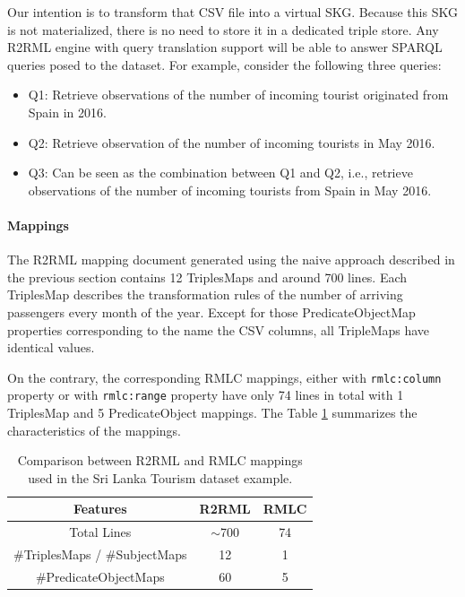 Our intention is to transform that CSV file into a virtual SKG. Because this SKG is not materialized, there is no need to store it in a dedicated triple store. Any R2RML engine with query translation support will be able to answer SPARQL queries posed to the dataset. For example, consider the following three queries:
\begin{itemize}
\item Q1: Retrieve observations of the number of incoming tourist originated from Spain in 2016.
\item Q2: Retrieve observation of the number of incoming tourists in May 2016.
\item Q3: Can be seen as the combination between Q1 and Q2, i.e., retrieve observations of the number of incoming tourists from Spain in May 2016. 
\end{itemize}

\noindent\paragraph{Mappings}
The R2RML mapping document generated using the naive approach described in the previous section contains 12 TriplesMaps and around 700 lines. Each TriplesMap describes the transformation rules of the number of arriving passengers every month of the year. Except for those PredicateObjectMap properties corresponding to the name the CSV columns, all TripleMaps have identical values. 

On the contrary, the corresponding RMLC mappings, either with \texttt{rmlc:column} property or with \texttt{rmlc:range} property have only 74 lines in total with 1 TriplesMap and 5 PredicateObject mappings. The Table \ref{table:compare1} summarizes the characteristics of the mappings.

\begin{table}[tbp]
\caption{Comparison between R2RML and RMLC mappings used in the Sri Lanka Tourism dataset example.}
\label{table:compare1}
\begin{tabular}{c|c|c}
\hline
\textbf{Features} & \textbf{R2RML}   & \textbf{RMLC}  \\ \hline
Total Lines   & $\sim$700 & 74 \\ 
\#TriplesMaps / \#SubjectMaps     & 12                & 1           \\
\#PredicateObjectMaps  & 60              & 5            \\ \hline
\end{tabular}
\end{table}

